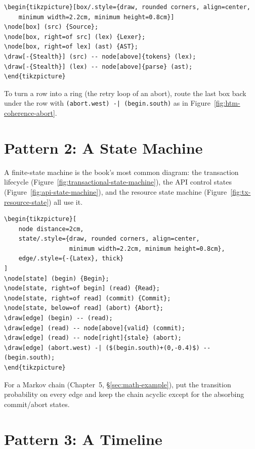 \begin{lstlisting}[language={}, caption={Pipeline row.}]
\begin{tikzpicture}[box/.style={draw, rounded corners, align=center,
    minimum width=2.2cm, minimum height=0.8cm}]
\node[box] (src) {Source};
\node[box, right=of src] (lex) {Lexer};
\node[box, right=of lex] (ast) {AST};
\draw[-{Stealth}] (src) -- node[above]{tokens} (lex);
\draw[-{Stealth}] (lex) -- node[above]{parse} (ast);
\end{tikzpicture}
\end{lstlisting}

To turn a row into a ring (the retry loop of an abort), route the last box
back under the row with \texttt{(abort.west) -| (begin.south)} as in
Figure~\ref{fig:htm-coherence-abort}.

\section{Pattern 2: A State Machine}

A finite-state machine is the book's most common diagram: the transaction
lifecycle (Figure~\ref{fig:transactional-state-machine}), the API control
states (Figure~\ref{fig:api-state-machine}), and the resource state machine
(Figure~\ref{fig:tx-resource-state}) all use it.

\begin{lstlisting}[language={}, caption={State machine with a self-loop and a labelled decision.}]
\begin{tikzpicture}[
    node distance=2cm,
    state/.style={draw, rounded corners, align=center,
                  minimum width=2.2cm, minimum height=0.8cm},
    edge/.style={-{Latex}, thick}
]
\node[state] (begin) {Begin};
\node[state, right=of begin] (read) {Read};
\node[state, right=of read] (commit) {Commit};
\node[state, below=of read] (abort) {Abort};
\draw[edge] (begin) -- (read);
\draw[edge] (read) -- node[above]{valid} (commit);
\draw[edge] (read) -- node[right]{stale} (abort);
\draw[edge] (abort.west) -| ($(begin.south)+(0,-0.4)$) -- (begin.south);
\end{tikzpicture}
\end{lstlisting}

For a Markov chain (Chapter~5, \S\ref{sec:math-example}), put the
transition probability on every edge and keep the chain acyclic except for
the absorbing commit/abort states.

\section{Pattern 3: A Timeline}

